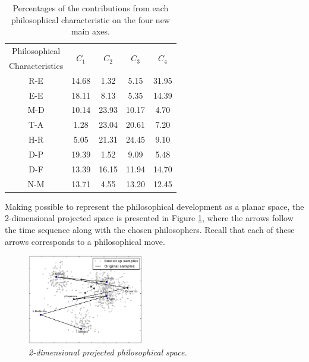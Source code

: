 \documentclass[%
 aip,
 jmp,%
 amsmath,amssymb,
 reprint,%
]{revtex4-1}
\begin{document}

\begin{table}%
\caption{\label{tab:Deviates}Percentages of
the contributions from each philosophical characteristic on the four new main axes.  }
\begin{tabular}{|c||c|c|c|c|}
\hline
Philosophical & \multirow{2}{*}{$C_1$} & \multirow{2}{*}{$C_2$} & \multirow{2}{*}{$C_3$} & \multirow{2}{*}{$C_4$}\\
Characteristics & & & & \\
\hline
R-E & 14.68   &  1.32 &  5.15 & 31.95 \\
E-E & 18.11   &  8.13 &  5.35 & 14.39 \\
M-D & 10.14   & 23.93 & 10.17 &  4.70 \\
T-A &  1.28   & 23.04 & 20.61 &  7.20 \\
H-R &  5.05   & 21.31 & 24.45 &  9.10 \\
D-P & 19.39   &  1.52 &  9.09 &  5.48 \\
D-F & 13.39   & 16.15 & 11.94 & 14.70 \\
N-M & 13.71   &  4.55 & 13.20 & 12.45 \\
\hline

\end{tabular}
\end{table}

Making possible to represent the philosophical development as a planar space, the 2-dimensional projected space is presented in Figure
\ref{fig:pca}, where the arrows follow the time sequence along with
the chosen philosophers.  Recall that each of these arrows corresponds
to a philosophical move.  



\begin{figure}
        \begin{center}
                \includegraphics[width=0.45\textwidth]{pca_filosofos_novo}
        \end{center}
        \caption{\it 2-dimensional projected philosophical space.}
        \label{fig:pca}
\end{figure}
\end{document}
